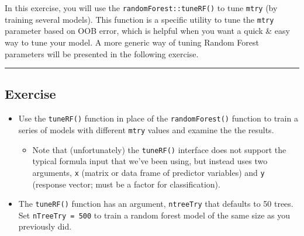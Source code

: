 \documentclass[
]{book}
\newenvironment{Shaded}{\begin{snugshade}}{\end{snugshade}}
\newcommand{\CommentTok}[1]{\textcolor[rgb]{0.56,0.35,0.01}{\textit{#1}}}
\newcommand{\DataTypeTok}[1]{\textcolor[rgb]{0.13,0.29,0.53}{#1}}
\newcommand{\DecValTok}[1]{\textcolor[rgb]{0.00,0.00,0.81}{#1}}
\newcommand{\KeywordTok}[1]{\textcolor[rgb]{0.13,0.29,0.53}{\textbf{#1}}}
\newcommand{\NormalTok}[1]{#1}
\newcommand{\OperatorTok}[1]{\textcolor[rgb]{0.81,0.36,0.00}{\textbf{#1}}}
\newcommand{\StringTok}[1]{\textcolor[rgb]{0.31,0.60,0.02}{#1}}
\providecommand{\tightlist}{%
  \setlength{\itemsep}{0pt}\setlength{\parskip}{0pt}}
\begin{document}
In this exercise, you will use the \texttt{randomForest::tuneRF()} to tune \texttt{mtry} (by training several models). This function is a specific utility to tune the \texttt{mtry} parameter based on OOB error, which is helpful when you want a quick \& easy way to tune your model. A more generic way of tuning Random Forest parameters will be presented in the following exercise.

\begin{center}\rule{0.5\linewidth}{0.5pt}\end{center}

\hypertarget{exercise-20}{%
\subsection*{Exercise}\label{exercise-20}}

\begin{itemize}
\tightlist
\item
  Use the \texttt{tuneRF()} function in place of the \texttt{randomForest()} function to train a series of models with different \texttt{mtry} values and examine the the results.

  \begin{itemize}
  \tightlist
  \item
    Note that (unfortunately) the \texttt{tuneRF()} interface does not support the typical formula input that we've been using, but instead uses two arguments, \texttt{x} (matrix or data frame of predictor variables) and \texttt{y} (response vector; must be a factor for classification).
  \end{itemize}
\item
  The \texttt{tuneRF()} function has an argument, \texttt{ntreeTry} that defaults to 50 trees. Set \texttt{nTreeTry\ =\ 500} to train a random forest model of the same size as you previously did.
\end{itemize}

\begin{Shaded}
\end{Shaded}
\end{document}
